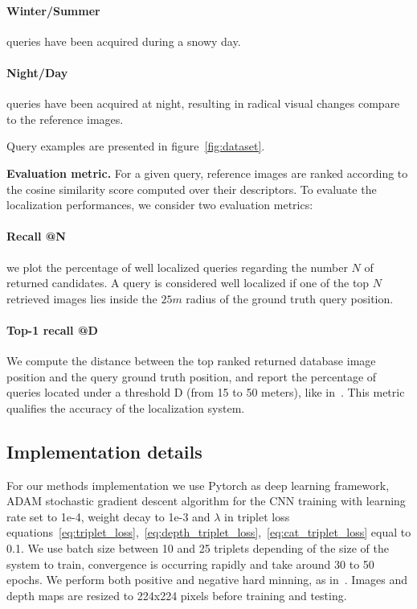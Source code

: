 	\paragraph{Winter/Summer} queries have been acquired during a snowy day.
	\paragraph{Night/Day} queries have been acquired at night, resulting in radical visual changes compare to the reference images.

Query examples are presented in figure~\ref{fig:dataset}.
	
\vspace{4pt}\noindent\textbf{Evaluation metric.} For a given query, reference images are ranked according to the cosine similarity score computed over their descriptors. To evaluate the localization performances, we consider two evaluation metrics:
	\setcounter{paragraph}{0}
	\paragraph{Recall @N} we plot the percentage of well localized queries regarding the number $N$ of returned candidates. A query is considered well localized if one of the top $N$ retrieved images lies inside the $25m$ radius of the ground truth query position.
	\paragraph{Top-1 recall @D} We compute the distance between the top ranked returned database image position and the query ground truth position, and report the percentage of queries located under a threshold D (from 15 to 50 meters), like in~\cite{Zamir2014}. This metric qualifies the accuracy of the localization system.

\subsection{Implementation details}
\label{subsec:implementation}

For our methods implementation we use Pytorch as deep learning framework, ADAM stochastic gradient descent algorithm for the CNN training with learning rate set to 1e-4, weight decay to 1e-3 and $\lambda$ in triplet loss equations~\ref{eq:triplet_loss},~\ref{eq:depth_triplet_loss},~\ref{eq:cat_triplet_loss} equal to 0.1. We use batch size between 10 and 25 triplets depending of the size of the system to train, convergence is occurring rapidly and take around 30 to 50 epochs. We perform both positive and negative hard minning, as in~\cite{Radenovic2017}. Images and depth maps are resized to 224x224 pixels before training and testing.

